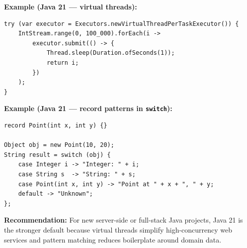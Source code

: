 \begin{solutionorbox}[5.5in]
\textbf{Example (Java 21 --- virtual threads):}
\begin{lstlisting}[style=java]
try (var executor = Executors.newVirtualThreadPerTaskExecutor()) {
    IntStream.range(0, 100_000).forEach(i ->
        executor.submit(() -> {
            Thread.sleep(Duration.ofSeconds(1));
            return i;
        })
    );
}
\end{lstlisting}

\textbf{Example (Java 21 --- record patterns in \lstinline[style=javainline]|switch|):}
\begin{lstlisting}[style=java]
record Point(int x, int y) {}

Object obj = new Point(10, 20);
String result = switch (obj) {
    case Integer i -> "Integer: " + i;
    case String s  -> "String: " + s;
    case Point(int x, int y) -> "Point at " + x + ", " + y;
    default -> "Unknown";
};
\end{lstlisting}

\textbf{Recommendation:} For new server-side or full-stack Java projects, Java 21 is the stronger default because virtual threads simplify high-concurrency web services and pattern matching reduces boilerplate around domain data.
\end{solutionorbox}

\newpage

